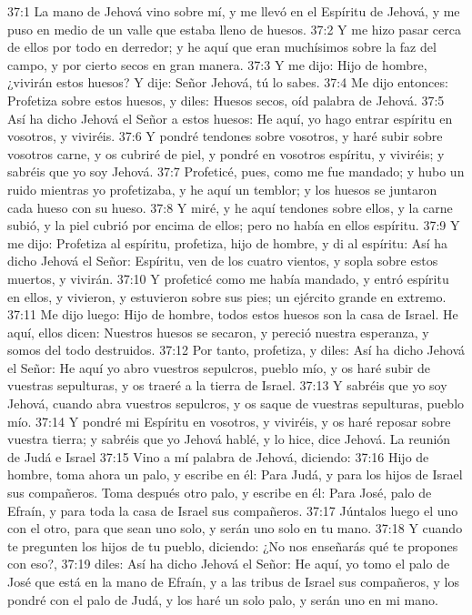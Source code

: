 37:1 La mano de Jehová vino sobre mí, y me llevó en el Espíritu de Jehová, y me puso en medio de un valle que estaba lleno de huesos.   
37:2 Y me hizo pasar cerca de ellos por todo en derredor; y he aquí que eran muchísimos sobre la faz del campo, y por cierto secos en gran manera.   
37:3 Y me dijo: Hijo de hombre, ¿vivirán estos huesos? Y dije: Señor Jehová, tú lo sabes.   
37:4 Me dijo entonces: Profetiza sobre estos huesos, y diles: Huesos secos, oíd palabra de Jehová.   
37:5 Así ha dicho Jehová el Señor a estos huesos: He aquí, yo hago entrar espíritu en vosotros, y viviréis.   
37:6 Y pondré tendones sobre vosotros, y haré subir sobre vosotros carne, y os cubriré de piel, y pondré en vosotros espíritu, y viviréis; y sabréis que yo soy Jehová.   
37:7 Profeticé, pues, como me fue mandado; y hubo un ruido mientras yo profetizaba, y he aquí un temblor; y los huesos se juntaron cada hueso con su hueso.   
37:8 Y miré, y he aquí tendones sobre ellos, y la carne subió, y la piel cubrió por encima de ellos; pero no había en ellos espíritu.   
37:9 Y me dijo: Profetiza al espíritu, profetiza, hijo de hombre, y di al espíritu: Así ha dicho Jehová el Señor: Espíritu, ven de los cuatro vientos, y sopla sobre estos muertos, y vivirán. 
37:10 Y profeticé como me había mandado, y entró espíritu en ellos, y vivieron, y estuvieron sobre sus pies; un ejército grande en extremo.   
37:11 Me dijo luego: Hijo de hombre, todos estos huesos son la casa de Israel. He aquí, ellos dicen: Nuestros huesos se secaron, y pereció nuestra esperanza, y somos del todo destruidos.   
37:12 Por tanto, profetiza, y diles: Así ha dicho Jehová el Señor: He aquí yo abro vuestros sepulcros, pueblo mío, y os haré subir de vuestras sepulturas, y os traeré a la tierra de Israel.   
37:13 Y sabréis que yo soy Jehová, cuando abra vuestros sepulcros, y os saque de vuestras sepulturas, pueblo mío.   
37:14 Y pondré mi Espíritu en vosotros, y viviréis, y os haré reposar sobre vuestra tierra; y sabréis que yo Jehová hablé, y lo hice, dice Jehová.   
La reunión de Judá e Israel   
37:15 Vino a mí palabra de Jehová, diciendo:   
37:16 Hijo de hombre, toma ahora un palo, y escribe en él: Para Judá, y para los hijos de Israel sus compañeros. Toma después otro palo, y escribe en él: Para José, palo de Efraín, y para toda la casa de Israel sus compañeros.   
37:17 Júntalos luego el uno con el otro, para que sean uno solo, y serán uno solo en tu mano.   
37:18 Y cuando te pregunten los hijos de tu pueblo, diciendo: ¿No nos enseñarás qué te propones con eso?,   
37:19 diles: Así ha dicho Jehová el Señor: He aquí, yo tomo el palo de José que está en la mano de Efraín, y a las tribus de Israel sus compañeros, y los pondré con el palo de Judá, y los haré un solo palo, y serán uno en mi mano.   
